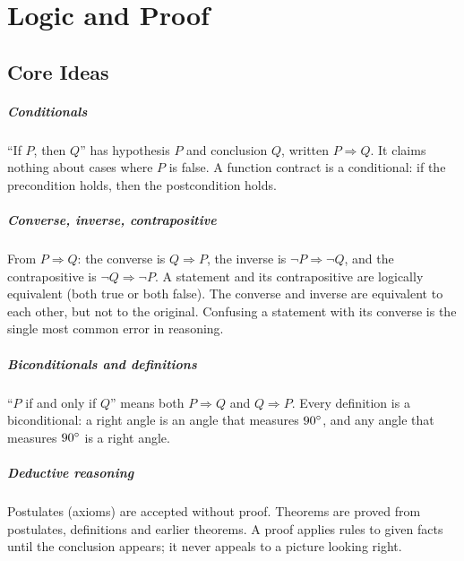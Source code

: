 \chapter{Logic and Proof}


\section{Core Ideas}

\paragraph{Conditionals} ``If $P$, then $Q$'' has hypothesis $P$ and conclusion $Q$, written $P \Rightarrow Q$. It claims nothing about cases where $P$ is false. A function contract is a conditional: if the precondition holds, then the postcondition holds.

\paragraph{Converse, inverse, contrapositive} From $P \Rightarrow Q$: the converse is $Q \Rightarrow P$, the inverse is $\lnot P \Rightarrow \lnot Q$, and the contrapositive is $\lnot Q \Rightarrow \lnot P$. A statement and its contrapositive are logically equivalent (both true or both false). The converse and inverse are equivalent to each other, but not to the original. Confusing a statement with its converse is the single most common error in reasoning.

\paragraph{Biconditionals and definitions} ``$P$ if and only if $Q$'' means both $P \Rightarrow Q$ and $Q \Rightarrow P$. Every definition is a biconditional: a right angle is an angle that measures $90^\circ$, and any angle that measures $90^\circ$ is a right angle.

\paragraph{Deductive reasoning} Postulates (axioms) are accepted without proof. Theorems are proved from postulates, definitions and earlier theorems. A proof applies rules to given facts until the conclusion appears; it never appeals to a picture looking right.

